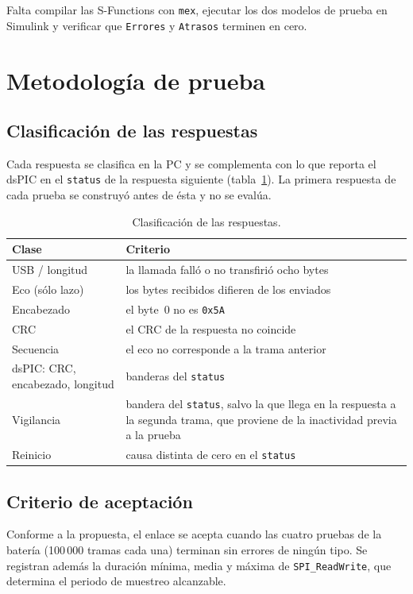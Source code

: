 \documentclass[11pt]{article}
\newcommand{\code}[1]{\texttt{#1}}
\begin{document}
Falta compilar las S-Functions con \code{mex}, ejecutar los dos modelos de
prueba en Simulink y verificar que \code{Errores} y \code{Atrasos} terminen
en cero.

\section{Metodología de prueba}

\subsection{Clasificación de las respuestas}

Cada respuesta se clasifica en la PC y se complementa con lo que reporta el
dsPIC en el \code{status} de la respuesta siguiente
(tabla~\ref{tab:clasif}). La primera respuesta de cada prueba se construyó
antes de ésta y no se evalúa.

\begin{table}[H]
\centering
\small
\begin{tabularx}{\linewidth}{@{}lX@{}}
\toprule
Clase & Criterio \\
\midrule
USB / longitud & la llamada falló o no transfirió ocho bytes \\
Eco (sólo lazo) & los bytes recibidos difieren de los enviados \\
Encabezado & el byte~0 no es \code{0x5A} \\
CRC & el CRC de la respuesta no coincide \\
Secuencia & el eco no corresponde a la trama anterior \\
dsPIC: CRC, encabezado, longitud & banderas del \code{status} \\
Vigilancia & bandera del \code{status}, salvo la que llega en la respuesta a la segunda trama, que proviene de la inactividad previa a la prueba \\
Reinicio & causa distinta de cero en el \code{status} \\
\bottomrule
\end{tabularx}
\caption{Clasificación de las respuestas.}
\label{tab:clasif}
\end{table}

\subsection{Criterio de aceptación}

Conforme a la propuesta, el enlace se acepta cuando las cuatro pruebas de la
batería (100\,000 tramas cada una) terminan sin errores de ningún tipo. Se
registran además la duración mínima, media y máxima de
\code{SPI\_ReadWrite}, que determina el periodo de muestreo alcanzable.
\end{document}

